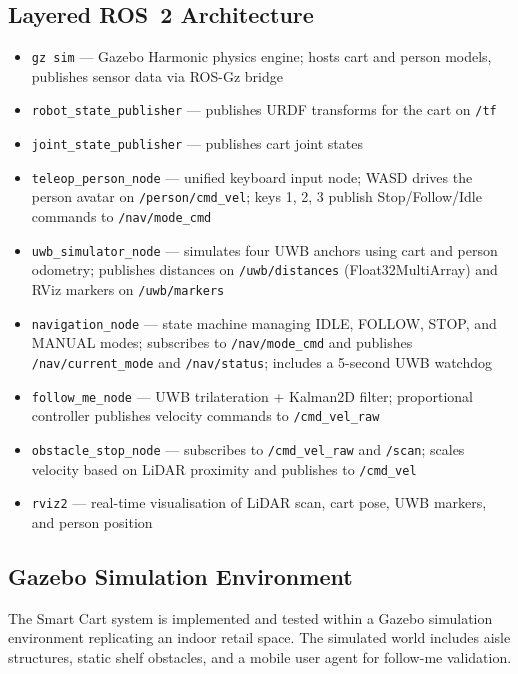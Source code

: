 \subsection{Layered ROS~2 Architecture}

\begin{itemize}
  \item \texttt{gz sim} --- Gazebo Harmonic physics engine; hosts cart 
        and person models, publishes sensor data via ROS-Gz bridge
  \item \texttt{robot\_state\_publisher} --- publishes URDF transforms 
        for the cart on \texttt{/tf}
  \item \texttt{joint\_state\_publisher} --- publishes cart joint states
  \item \texttt{teleop\_person\_node} --- unified keyboard input node; 
        WASD drives the person avatar on \texttt{/person/cmd\_vel}; 
        keys 1, 2, 3 publish Stop/Follow/Idle commands to 
        \texttt{/nav/mode\_cmd}
  \item \texttt{uwb\_simulator\_node} --- simulates four UWB anchors 
        using cart and person odometry; publishes distances on 
        \texttt{/uwb/distances} (Float32MultiArray) and RViz markers 
        on \texttt{/uwb/markers}
  \item \texttt{navigation\_node} --- state machine managing IDLE, 
        FOLLOW, STOP, and MANUAL modes; subscribes to 
        \texttt{/nav/mode\_cmd} and publishes \texttt{/nav/current\_mode} 
        and \texttt{/nav/status}; includes a 5-second UWB watchdog
  \item \texttt{follow\_me\_node} --- UWB trilateration + Kalman2D 
        filter; proportional controller publishes velocity commands to 
        \texttt{/cmd\_vel\_raw}
  \item \texttt{obstacle\_stop\_node} --- subscribes to 
        \texttt{/cmd\_vel\_raw} and \texttt{/scan}; scales velocity 
        based on LiDAR proximity and publishes to \texttt{/cmd\_vel}
  \item \texttt{rviz2} --- real-time visualisation of LiDAR scan, 
        cart pose, UWB markers, and person position
\end{itemize}

\subsection{Gazebo Simulation Environment}

The Smart Cart system is implemented and tested within a Gazebo 
simulation environment replicating an indoor retail space. The 
simulated world includes aisle structures, static shelf obstacles, 
and a mobile user agent for follow-me validation.

